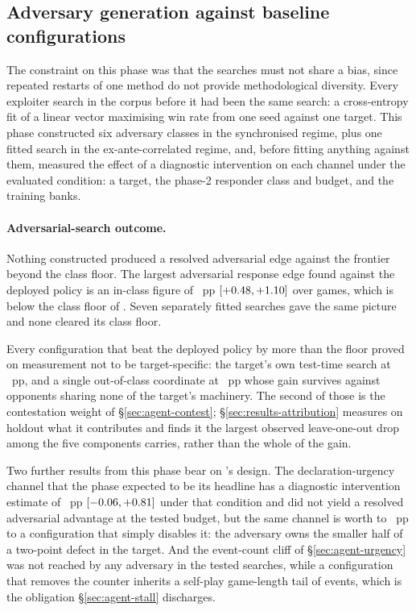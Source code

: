 \subsection{Adversary generation against baseline configurations}
\label{sec:development-adversaries}

The constraint on this phase was that the searches must not share a bias, since repeated restarts
of one method do not provide methodological diversity. Every exploiter search in the corpus before it
had been the same search: a cross-entropy fit of a linear vector maximising win rate from one seed
against one target. This phase constructed six adversary classes in the synchronised regime, plus
one fitted search in the ex-ante-correlated regime, and, before fitting anything against them,
measured the effect of a diagnostic intervention on each channel under the evaluated condition: a
\vsix{} target, the phase-2 responder class and budget, and the training banks.

\paragraph{Adversarial-search outcome.}
Nothing constructed produced a resolved adversarial edge against the \vsix{} frontier beyond the
class floor. The largest adversarial response edge found against the deployed policy is an in-class
figure of \vsevenBestExploit{}~pp $[+0.48, +1.10]$ over
\vsevenBestExploitN{} games, which is below the class floor of \vsevenPrimaryFloor{}. Seven
separately fitted searches gave the same picture and none cleared its class floor.

Every configuration that beat the deployed policy by more than the floor proved on measurement not
to be target-specific: the target's own test-time search at \vsevenSearchAsExploit{}~pp, and a
single out-of-class coordinate at \vsevenOneSwitchArm{}~pp whose gain survives against opponents
sharing none of the target's machinery. The second of those is the contestation weight of
\S\ref{sec:agent-contest}; \S\ref{sec:results-attribution} measures on holdout what it contributes
and finds it the largest observed leave-one-out drop among the five components \sestina{} carries,
rather than the whole of the gain.

Two further results from this phase bear on \sestina{}'s design. The declaration-urgency channel
that the phase expected to be its headline has a diagnostic intervention estimate of
\vsevenUrgencyCeiling{}~pp $[-0.06, +0.81]$ under that
condition and did not yield a resolved adversarial advantage at the tested budget, but the same channel is worth \vsevenUrgencyWorthLo{} to
\vsevenUrgencyWorthHi{}~pp to a configuration that simply disables it: the adversary owns the
smaller half of a two-point defect in the target. And the event-count cliff of
\S\ref{sec:agent-urgency} was not reached by any adversary in the tested searches, while a
configuration that removes the counter inherits a self-play game-length tail of \vsevenCliffTail{}
events, which is the obligation \S\ref{sec:agent-stall} discharges.

